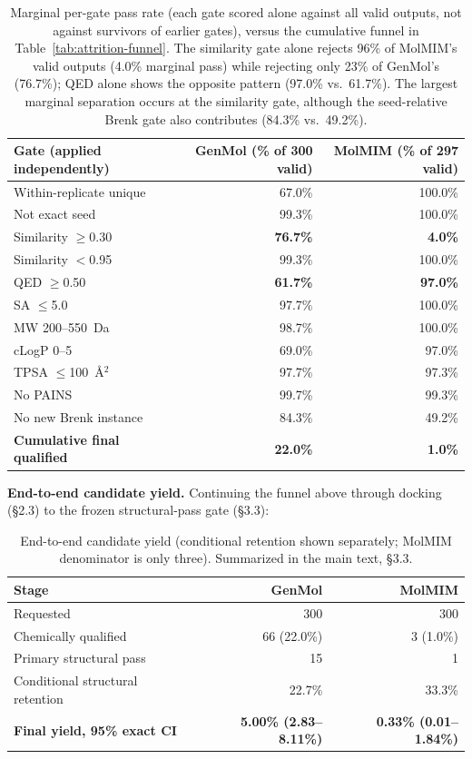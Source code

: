 \documentclass{article}
\begin{document}
\begin{table}[h]
\centering
\footnotesize
\begin{tabular}{lrr}
\toprule
Gate (applied independently) & GenMol (\% of 300 valid) & MolMIM (\% of 297 valid) \\
\midrule
Within-replicate unique & 67.0\% & 100.0\% \\
Not exact seed & 99.3\% & 100.0\% \\
Similarity $\geq$0.30 & \textbf{76.7\%} & \textbf{4.0\%} \\
Similarity $<$0.95 & 99.3\% & 100.0\% \\
QED $\geq$0.50 & \textbf{61.7\%} & \textbf{97.0\%} \\
SA $\leq$5.0 & 97.7\% & 100.0\% \\
MW 200--550~Da & 98.7\% & 100.0\% \\
cLogP 0--5 & 69.0\% & 97.0\% \\
TPSA $\leq$100~\AA$^2$ & 97.7\% & 97.3\% \\
No PAINS & 99.7\% & 99.3\% \\
No new Brenk instance & 84.3\% & 49.2\% \\
\midrule
\textbf{Cumulative final qualified} & \textbf{22.0\%} & \textbf{1.0\%} \\
\bottomrule
\end{tabular}
\caption{Marginal per-gate pass rate (each gate scored alone against all valid outputs, not against survivors of earlier gates), versus the cumulative funnel in Table~\ref{tab:attrition-funnel}. The similarity gate alone rejects 96\% of MolMIM's valid outputs (4.0\% marginal pass) while rejecting only 23\% of GenMol's (76.7\%); QED alone shows the opposite pattern (97.0\% vs.\ 61.7\%). The largest marginal separation occurs at the similarity gate, although the seed-relative Brenk gate also contributes (84.3\% vs.\ 49.2\%).}
\end{table}

\textbf{End-to-end candidate yield.} Continuing the funnel above through docking (\S2.3) to the frozen structural-pass gate (\S3.3):

\begin{table}[h]
\centering
\footnotesize
\begin{tabular}{lrr}
\toprule
Stage & GenMol & MolMIM \\
\midrule
Requested & 300 & 300 \\
Chemically qualified & 66 (22.0\%) & 3 (1.0\%) \\
Primary structural pass & 15 & 1 \\
Conditional structural retention & 22.7\% & 33.3\% \\
\textbf{Final yield, 95\% exact CI} & \textbf{5.00\% (2.83--8.11\%)} & \textbf{0.33\% (0.01--1.84\%)} \\
\bottomrule
\end{tabular}
\caption{End-to-end candidate yield (conditional retention shown separately; MolMIM denominator is only three). Summarized in the main text, \S3.3.}
\end{table}
\end{document}

